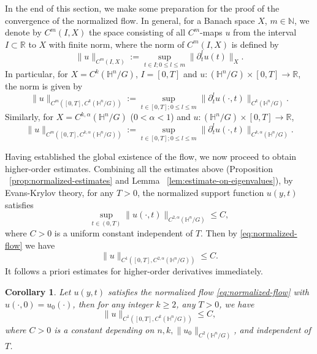 \documentclass[10pt,a4paper]{amsart}
\newtheorem{corollary}[theorem]{Corollary}
\newcommand{\R}{\ensuremath{\mathbb{R}}}
\newcommand{\N}{\ensuremath{\mathbb{N}}}
\renewcommand{\H}{{\mathbb{H}}}
\numberwithin{equation}{section}
\begin{document}
In the end of this section, we make some preparation for the proof of the convergence of the normalized flow. In general, for a Banach space \(X\), \(m\in \N\), we denote by \(C^{m}(I,X)\) the space consisting of all \(C^{m}\)-maps \(u\) from the interval \(I \subset \mathbb{R}\) to \(X\) with finite norm, where the norm of \(C^{m}(I,X)\) is defined by 
\begin{equation}
    \|u\|_{C^{m}(I,X)} := \sup_{t\in I ; 0\leq l \leq m}\|\partial_t^{l}u(t)\|_{X}.
\end{equation} 
In particular, for \(X = C^{k}(\H^n / G)\), \(I = [0,T]\) and \(u: (\H^n / G)\times [0,T] \to \R\), the norm is given by
\begin{equation}
    \|u\|_{C^{m}\left([0,T],C^{k}(\H^n / G)\right)} := \sup_{t\in[0,T] ; 0\leq l \leq m}\|\partial_t^{l}u(\cdot,t)\|_{C^{k}(\H^n / G)}.
\end{equation}
Similarly, for \(X = C^{k,\alpha}(\H^n / G)\) (\(0 < \alpha < 1\)) and \(u: (\H^n / G)\times [0,T] \to \R\),
\begin{equation}
    \|u\|_{C^{m}\left([0,T],C^{k,\alpha}(\H^n / G)\right)} := \sup_{t\in[0,T] ; 0\leq l \leq m}\|\partial_t^{l}u(\cdot,t)\|_{C^{k,\alpha}(\H^n / G)}.
\end{equation}
\par Having established the global existence of the flow, we now proceed to obtain higher-order estimates. Combining all the estimates above (Proposition ~\ref{prop:normalized-estimates} and Lemma ~\ref{lem:estimate-on-eigenvalues}), by Evans-Krylov theory, for any \(T > 0\), the normalized support function \(u(y,t)\) satisfies
\[ \sup_{t\in(0,T)}\|u(\cdot,t)\|_{C^{2,\alpha}(\H^n / G)} \leq C, \] 
where \(C>0\) is a uniform constant independent of \(T\). Then by \eqref{eq:normalized-flow} we have 
\begin{equation}
    \|u\|_{C^{1}\left([0,T],C^{2,\alpha}(\H^n / G)\right)} \leq C.
\end{equation}
It follows a priori estimates for higher-order derivatives immediately. 
\begin{corollary}\label{cor:higer-order estimates}
    Let \(u(y,t)\) satisfies the normalized flow \eqref{eq:normalized-flow} with \(u(\cdot,0) = u_0(\cdot)\), then for any integer \(k\geq 2\), any \(T > 0\), we have
    \begin{equation}
        \|u\|_{C^{1}([0,T],C^{k}(\H^n / G))} \leq C,
    \end{equation}
    where \(C > 0\) is a constant depending on \(n,k,\|u_0\|_{C^{2}(\H^n / G)}\), and independent of \(T\).
\end{corollary}
\end{document}
